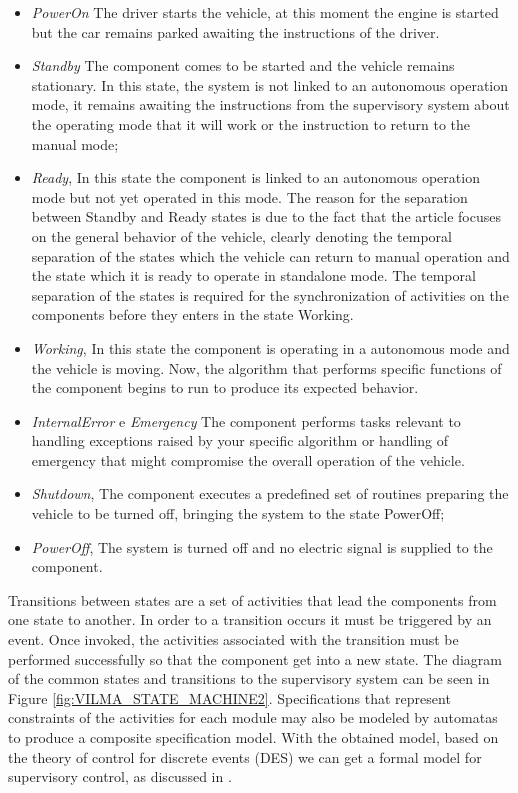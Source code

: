 \documentclass[conference]{IEEEtran}
\begin{document}
\begin{itemize}

	\item \textit{PowerOn} The driver starts the vehicle, at this moment the engine is started but the car remains parked awaiting the instructions of the driver. 
	
	\item \textit{Standby} The component comes to be started and the vehicle remains stationary. In this state, the system is not linked to an autonomous operation mode, it remains awaiting the instructions from the supervisory system about the operating mode that it will work or the instruction to return to the manual mode;
		
	\item \textit{Ready}, In this state the component is linked to an autonomous operation mode but not yet operated in this mode. The reason for the separation between Standby and Ready states is due to the fact that the article focuses on the general behavior of the vehicle, clearly denoting the temporal separation of the states which the vehicle can return to manual operation and the state which it is ready to operate in standalone mode. The temporal separation of the states is required for the synchronization of activities on the components before they enters in the state Working.
	
	\item \textit{Working}, In this state the component is operating in a autonomous mode and the vehicle is moving. Now, the algorithm that performs specific functions of the component begins to run to produce its expected behavior.

	\item \textit{InternalError} e \textit{Emergency} The component performs tasks relevant to handling exceptions raised by your specific algorithm or handling of emergency that might compromise the overall operation of the vehicle.
		
	\item \textit{Shutdown}, The component executes a predefined set of routines preparing the vehicle to be turned off, bringing the system to the state PowerOff;
	
	\item \textit{PowerOff}, The system is turned off and no electric signal is supplied to the component.
\end{itemize}

Transitions between states are a set of activities that lead the components from one state to another. In order to a transition occurs it must be triggered by an event. Once invoked, the activities associated with the transition must be performed successfully so that the component get into a new state. The diagram of the common states and transitions to the supervisory system can be seen in Figure \ref{fig:VILMA_STATE_MACHINE2}. Specifications that represent constraints of the activities for each module may also be modeled by automatas to produce a composite  specification model. With the obtained model, based on the theory of control for discrete events (DES) we can get a formal model for supervisory control, as discussed in \cite{event_systems}.
\end{document}
